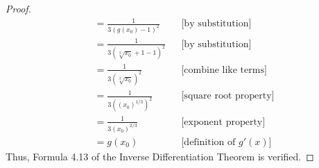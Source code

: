 \documentclass{article}
\begin{document}
\begin{proof}
\begin{align*}
      &= \frac{1}{3(g(x_0)-1)^2}  && \text{[by substitution]}\\
      &= \frac{1}{3(\sqrt[3]{x_0} + 1-1)^2}  && \text{[by substitution]}\\
      &= \frac{1}{3(\sqrt[3]{x_0})^2}  && \text{[combine like terms]}\\
      &= \frac{1}{3((x_0)^{1/3})^2}  && \text{[square root property]}\\
      &= \frac{1}{3(x_0)^{2/3}}  && \text{[exponent property]}\\
      &= g(x_0) && \text{[definition of } g'(x) ]
    \end{align*}
    Thus, Formula 4.13 of the Inverse Differentiation Theorem is verified.
  \end{proof}
\end{document}
